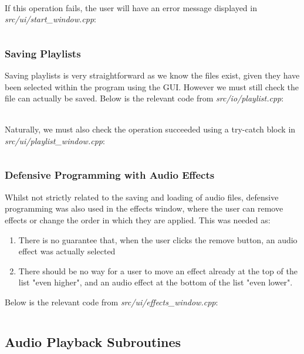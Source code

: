 \paragraph{}
If this operation fails, the user will have an error message displayed in \textit{src/ui/start\_window.cpp}:
\inputminted[linenos, firstline=44, lastline=80]{c++}{../src/ui/start_window.cpp}

\pagebreak
\subsubsection{Saving Playlists}
Saving playlists is very straightforward as we know the files exist, given they have been selected within the program using the GUI. However we must still check the file can actually be saved. Below is the relevant code from \textit{src/io/playlist.cpp}:
\inputminted[linenos, firstline=25, lastline=55]{c++}{../src/io/playlist.cpp}

\paragraph{}
Naturally, we must also check the operation succeeded using a try-catch block in \textit{src/ui/playlist\_window.cpp}:
\inputminted[linenos, firstline=84, lastline=118]{c++}{../src/ui/playlist_window.cpp}

\pagebreak
\subsubsection{Defensive Programming with Audio Effects}
Whilst not strictly related to the saving and loading of audio files, defensive programming was also used in the effects window, where the user can remove effects or change the order in which they are applied. This was needed as:
\begin{enumerate}
	\item There is no guarantee that, when the user clicks the remove button, an audio effect was actually selected
	\item There should be no way for a user to move an effect already at the top of the list "even higher", and an audio effect at the bottom of the list "even lower".
\end{enumerate}
Below is the relevant code from \textit{src/ui/effects\_window.cpp}:
\inputminted[linenos, firstline=57, lastline=102]{c++}{../src/ui/effects_window.cpp}

\pagebreak
\subsection{Audio Playback Subroutines}
